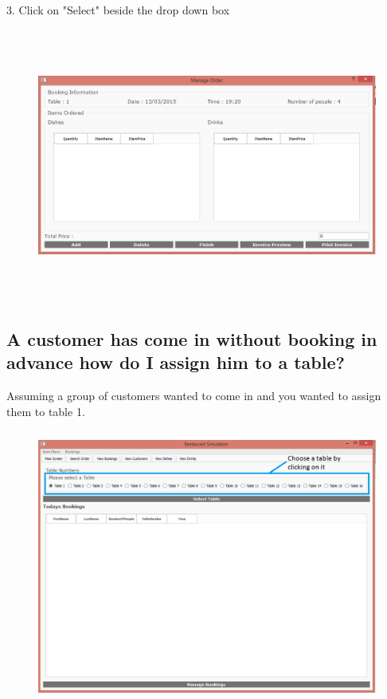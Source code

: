 3. Click on "Select" beside the drop down box

\begin{figure}[H]
    \includegraphics[height = 9cm]{./Manual/images/base/assignExample2} 
    \caption{} \label{fig:assignex2}
\end{figure}

\subsection{A customer has come in without booking in advance how do I assign him to a table?}
Assuming a group of customers wanted to come in and you wanted to assign them to table 1.

\begin{figure}[H]
    \includegraphics[height = 9cm]{./Manual/images/AssignCust1} 
    \caption{} \label{fig:assigncust1}
\end{figure}

